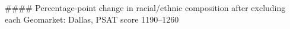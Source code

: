 #### Percentage-point change in racial/ethnic composition after excluding each Geomarket: Dallas, PSAT score 1190–1260
